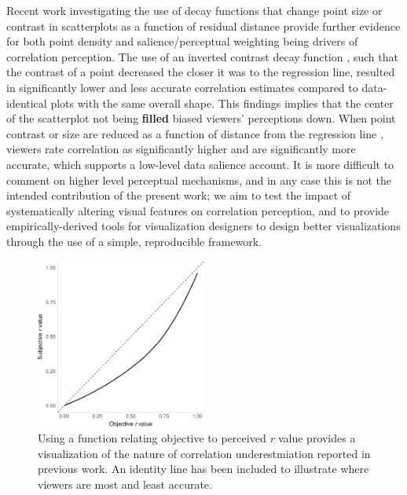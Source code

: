 \documentclass[manuscript, anonymous, screen]{acmart}
\begin{document}
Recent work investigating the use of decay functions that change point
size or contrast in scatterplots as a function of residual distance
provide further evidence for both point density and salience/perceptual
weighting being drivers of correlation perception. The use of an
inverted contrast decay function \citep{strain_2023}, such that the
contrast of a point decreased the closer it was to the regression line,
resulted in significantly lower and less accurate correlation estimates
compared to data-identical plots with the same overall shape. This
findings implies that the center of the scatterplot not being
\textbf{filled} biased viewers' perceptions down. When point contrast or
size are reduced as a function of distance from the regression line
\citep{strain_2023, strain_2023b}, viewers rate correlation as
significantly higher and are significantly more accurate, which supports
a low-level data salience account. It is more difficult to comment on
higher level perceptual mechanisms, and in any case this is not the
intended contribution of the present work; we aim to test the impact of
systematically altering visual features on correlation perception, and
to provide empirically-derived tools for visualization designers to
design better visualizations through the use of a simple, reproducible
framework.

\begin{figure}

\includegraphics[width=0.5\textwidth,height=\textheight]{size_and_contrast_new_files/figure-pdf/fig-underestimation-curve-1.pdf} \hfill{}

\caption{\label{fig-underestimation-curve}Using a function relating
objective to perceived \emph{r} value \citep{rensink_2017} provides a
visualization of the nature of correlation underestmiation reported in
previous work. An identity line has been included to illustrate where
viewers are most and least accurate.}

\end{figure}
\end{document}
